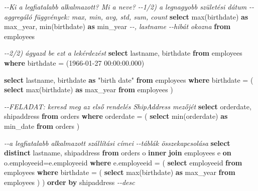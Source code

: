 \documentclass[
  magyar,
]{article}
\newenvironment{Shaded}{}{}
\newcommand{\CommentTok}[1]{\textcolor[rgb]{0.38,0.63,0.69}{\textit{#1}}}
\newcommand{\FunctionTok}[1]{\textcolor[rgb]{0.02,0.16,0.49}{#1}}
\newcommand{\KeywordTok}[1]{\textcolor[rgb]{0.00,0.44,0.13}{\textbf{#1}}}
\newcommand{\NormalTok}[1]{#1}
\newcommand{\OperatorTok}[1]{\textcolor[rgb]{0.40,0.40,0.40}{#1}}
\newcommand{\OtherTok}[1]{\textcolor[rgb]{0.00,0.44,0.13}{#1}}
\newcommand{\StringTok}[1]{\textcolor[rgb]{0.25,0.44,0.63}{#1}}
\begin{document}
\begin{Shaded}
\begin{Highlighting}[]
\CommentTok{{-}{-}Ki a legfiatalabb alkalmazott? Mi a neve?}
\CommentTok{{-}{-}1/2) a legnagyobb születési dátum}
\CommentTok{{-}{-}aggregáló függvények: max, min, avg, std, sum, count}
\KeywordTok{select} \FunctionTok{max}\NormalTok{(birthdate) }\KeywordTok{as}\NormalTok{ max\_year, }\FunctionTok{min}\NormalTok{(birthdate) }\KeywordTok{as}\NormalTok{ min\_year}
\CommentTok{{-}{-}, lastname {-}{-}hibát okozna}
\KeywordTok{from}\NormalTok{ employees}

\CommentTok{{-}{-}2/2) ágyazd be ezt a lekérdezést}
\KeywordTok{select}\NormalTok{ lastname, birthdate }\KeywordTok{from}\NormalTok{ employees}
\KeywordTok{where}\NormalTok{ birthdate }\OperatorTok{=}\NormalTok{ (}\StringTok{\textquotesingle{}1966{-}01{-}27 00:00:00.000\textquotesingle{}}\NormalTok{)}

\KeywordTok{select}\NormalTok{ lastname, birthdate }\KeywordTok{as} \OtherTok{"birth date"} \KeywordTok{from}\NormalTok{ employees}
\KeywordTok{where}\NormalTok{ birthdate }\OperatorTok{=}\NormalTok{ (}
  \KeywordTok{select} \FunctionTok{max}\NormalTok{(birthdate) }\KeywordTok{as}\NormalTok{ max\_year}
  \KeywordTok{from}\NormalTok{ employees}
\NormalTok{)}

\CommentTok{{-}{-}FELADAT: keresd meg az első rendelés ShipAddress mezőjét}
\KeywordTok{select}\NormalTok{ orderdate, shipaddress }\KeywordTok{from}\NormalTok{ orders}
\KeywordTok{where}\NormalTok{ orderdate }\OperatorTok{=}\NormalTok{ (}
  \KeywordTok{select} \FunctionTok{min}\NormalTok{(orderdate) }\KeywordTok{as}\NormalTok{ min\_date}
  \KeywordTok{from}\NormalTok{ orders}
\NormalTok{)}

\CommentTok{{-}{-}a legfiatalabb alkalmazott szállítási címei}
\CommentTok{{-}{-}táblák összekapcsolása}
\KeywordTok{select} \KeywordTok{distinct}\NormalTok{ lastname, shipaddress}
\KeywordTok{from}\NormalTok{ orders o }\KeywordTok{inner} \KeywordTok{join}\NormalTok{ employees e }\KeywordTok{on}\NormalTok{ o.employeeid}\OperatorTok{=}\NormalTok{e.employeeid}
\KeywordTok{where}\NormalTok{ e.employeeid }\OperatorTok{=}\NormalTok{ (}
  \KeywordTok{select}\NormalTok{ employeeid }\KeywordTok{from}\NormalTok{ employees}
  \KeywordTok{where}\NormalTok{ birthdate }\OperatorTok{=}\NormalTok{ (}
    \KeywordTok{select} \FunctionTok{max}\NormalTok{(birthdate) }\KeywordTok{as}\NormalTok{ max\_year}
    \KeywordTok{from}\NormalTok{ employees}
\NormalTok{  )}
\NormalTok{)}
\KeywordTok{order} \KeywordTok{by}\NormalTok{ shipaddress }\CommentTok{{-}{-}desc}
\end{Highlighting}
\end{Shaded}
\end{document}
